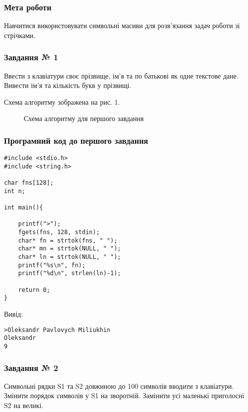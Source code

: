 \documentclass[12pt]{extreport}
\begin{document}


\subsubsection*{Мета роботи}
Навчитися використовувати символьні масиви для розв’язання задач
роботи зі стрічками.
\bigskip


\subsubsection*{Завдання № 1}
Ввести з клавіатури своє прізвище, ім'я та по батькові як одне текстове
дане. Вивести ім'я та кількість букв у прізвищі.

\bigskip
Схема алгоритму зображена на рис. 1.

\begin{figure}[h]
	\centering
	
	\caption{Схема алгоритму для першого завдання}
\end{figure}

\subsubsection*{Програмний код до першого завдання}

\begin{lstlisting}[frame=single]
#include <stdio.h>
#include <string.h>

char fns[128];
int n;

int main(){

	printf(">");
	fgets(fns, 128, stdin);
	char* fn = strtok(fns, " ");
	char* mn = strtok(NULL, " ");
	char* ln = strtok(NULL, " ");
	printf("%s\n", fn);
	printf("%d\n", strlen(ln)-1);

	return 0;
}
\end{lstlisting}

Вивід:

\begin{lstlisting}
>Oleksandr Pavlovych Miliukhin
Oleksandr
9
\end{lstlisting}

\subsubsection*{Завдання № 2}

Символьні рядки S1 та S2 довжиною до 100 символів вводити з клавіатури.
Змінити порядок символів у S1 на зворотній. Замінити усі маленькі
приголосні S2 на великі.
\end{document}
